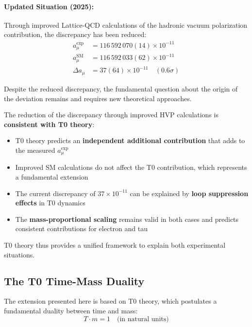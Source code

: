 \documentclass[12pt,a4paper]{article}
\theoremstyle{definition}
\begin{document}
	\paragraph{Updated Situation (2025):}
	Through improved Lattice-QCD calculations of the hadronic vacuum polarization contribution, the discrepancy has been reduced\cite{sm_g2_2025,mug2_final_2025}:
	\begin{align}
		a_\mu^{\text{exp}} &= 116\,592\,070(14) \times 10^{-11}\\
		a_\mu^{\text{SM}} &= 116\,592\,033(62) \times 10^{-11}\\
		\Delta a_\mu &= 37(64) \times 10^{-11} \quad (0.6\sigma) \label{eq:new_discrepancy}
	\end{align}
	
	Despite the reduced discrepancy, the fundamental question about the origin of the deviation remains and requires new theoretical approaches.
	
	\begin{explanation}
		The reduction of the discrepancy through improved HVP calculations is \textbf{consistent with T0 theory}:
		
		\begin{itemize}
			\item T0 theory predicts an \textbf{independent additional contribution} that adds to the measured $a_\mu^{\text{exp}}$
			\item Improved SM calculations do not affect the T0 contribution, which represents a fundamental extension
			\item The current discrepancy of $37 \times 10^{-11}$ can be explained by \textbf{loop suppression effects} in T0 dynamics
			\item The \textbf{mass-proportional scaling} remains valid in both cases and predicts consistent contributions for electron and tau
		\end{itemize}
		
		T0 theory thus provides a unified framework to explain both experimental situations.
	\end{explanation}
	
	\subsection{The T0 Time-Mass Duality}
	
	The extension presented here is based on T0 theory\cite{pascher_t0_theory_2025}, which postulates a fundamental duality between time and mass:
	\begin{equation}
		T \cdot m = 1 \quad \text{(in natural units)}
	\end{equation}
	
\end{document}
